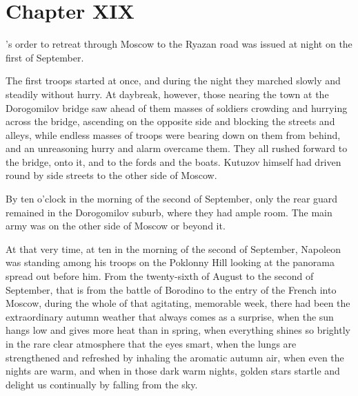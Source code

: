 
\chapter*{Chapter XIX} \ifaudio {}
\fi

's order to retreat through Moscow to the Ryazan road was
issued at night on the first of September.

The first troops started at once, and during the night they
marched slowly and steadily without hurry. At daybreak, however,
those nearing the town at the Dorogomilov bridge saw ahead of
them masses of soldiers crowding and hurrying across the bridge,
ascending on the opposite side and blocking the streets and
alleys, while endless masses of troops were bearing down on them
from behind, and an unreasoning hurry and alarm overcame
them. They all rushed forward to the bridge, onto it, and to the
fords and the boats. Kutuzov himself had driven round by side
streets to the other side of Moscow.

By ten o'clock in the morning of the second of September, only
the rear guard remained in the Dorogomilov suburb, where they had
ample room. The main army was on the other side of Moscow or
beyond it.

At that very time, at ten in the morning of the second of
September, Napoleon was standing among his troops on the Poklonny
Hill looking at the panorama spread out before him. From the
twenty-sixth of August to the second of September, that is from
the battle of Borodino to the entry of the French into Moscow,
during the whole of that agitating, memorable week, there had
been the extraordinary autumn weather that always comes as a
surprise, when the sun hangs low and gives more heat than in
spring, when everything shines so brightly in the rare clear
atmosphere that the eyes smart, when the lungs are strengthened
and refreshed by inhaling the aromatic autumn air, when even the
nights are warm, and when in those dark warm nights, golden stars
startle and delight us continually by falling from the sky.

